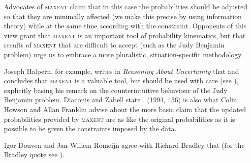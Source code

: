 \documentclass[12pt]{article}
\begin{document}
Advocates of \textsc{maxent} claim that in this case the probabilities
should be adjusted so that they are minimally affected (we make this
precise by using information theory) while at the same time according
with the constraint. Opponents of this view grant that \textsc{maxent}
is an important tool of probability kinematics, but that results of
\textsc{maxent} that are difficult to accept (such as the Judy
Benjamin problem) urge us to embrace a more pluralistic,
situation-specific methodology.

Joseph Halpern, for example, writes in \emph{Reasoning About
  Uncertainty} that   and
concludes that \textsc{maxent} is a valuable tool, but should be used
with care (see ), explicitly basing his
remark on the counterintuitive behaviour of the Judy Benjamin problem.
Diaconis and Zabell state 
.  (1994, 456) is
also what Colin Howson and Allan Franklin advise about the more basic
claim that the updated probabilities provided by \textsc{maxent} are
as like the original probabilities as it is possible to be given the
constraints imposed by the data.

Igor Douven and Jan-Willem Romeijn agree with Richard Bradley that
  (for the
Bradley quote see ).
\end{document}
